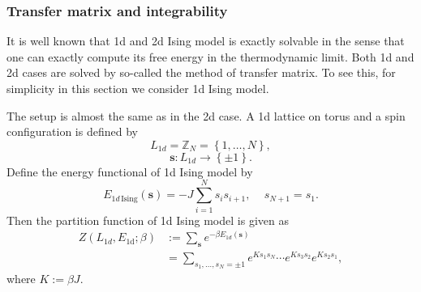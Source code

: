 \subsubsection{Transfer matrix and integrability}

It is well known that 1d and 2d Ising model is exactly solvable in
the sense that one can exactly compute its free energy in the thermodynamic
limit. Both 1d and 2d cases are solved by so-called the method of
transfer matrix. To see this, for simplicity in this section we consider
1d Ising model. 

The setup is almost the same as in the 2d case. A 1d lattice on torus
and a spin configuration is defined by
\begin{equation}
L_{1d}  =  \mathbb{Z}_{N}  =  \left\{ 1,\ldots,N\right\} ,
\end{equation}
%
\begin{equation}
\mathbf{s}  :  L_{1d}  \longrightarrow  \left\{ \pm1\right\} .
\end{equation}
Define the energy functional of 1d Ising model by 
\begin{equation}
  E_{1d\,\mathrm{Ising}}\left(\mathbf{s}\right)  =  -J\sum_{i=1}^{N}s_{i}s_{i+1},\quad\,s_{N+1}=s_{1}.
\end{equation}
 Then the partition function of 1d Ising model is given as 
\begin{align}
  Z\left(L_{1d},E_{\mathrm{1d}};\beta\right) 
  & :=  \sum_{\mathbf{s}}  e^{-\beta E_{1d}\left(\mathbf{s}\right)}\nonumber \\
  & =   \sum_{s_{1},\ldots,s_{N}=\pm1}  e^{Ks_{1}s_{N}}  \cdots  e^{Ks_{3}s_{2}}e^{Ks_{2}s_{1}},
\end{align}
 where $K:=\beta J$. 
 
